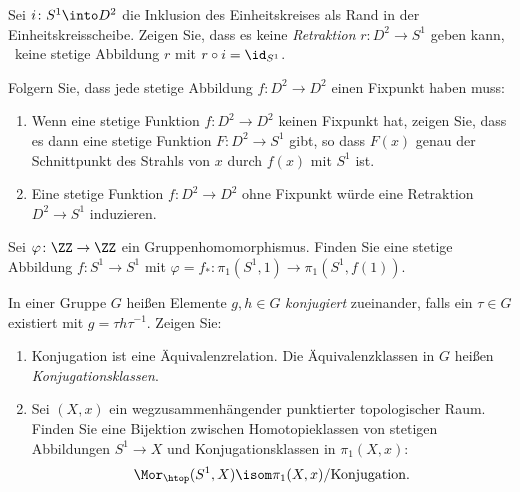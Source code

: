 

\setcounter{Sheet}{7}



\maketitle
\begin{exercise}
Sei $i\colon S^1\into D^2$ die Inklusion des Einheitskreises als Rand in
der Einheitskreisscheibe. Zeigen Sie, dass es keine \emph{Retraktion} $r\colon
D^2\to S^1$ geben kann, \ddh~keine stetige Abbildung $r$ mit $r\circ i =
\id_{S^1}$.

Folgern Sie, dass jede stetige Abbildung $f\colon D^2\to D^2$ einen Fixpunkt
haben muss:
\begin{enumerate}
\item Wenn eine stetige Funktion $f\colon D^2\to D^2$ keinen Fixpunkt hat, zeigen
Sie, dass es dann eine stetige Funktion $F\colon D^2\to S^1$ gibt, so dass
$F(x)$ genau der Schnittpunkt des Strahls von $x$ durch $f(x)$ mit $S^1$ ist.
\item Eine stetige Funktion $f\colon D^2\to D^2$ ohne Fixpunkt würde eine
Retraktion $D^2\to S^1$ induzieren.
\end{enumerate}
\end{exercise}
\begin{exercise}
Sei $\varphi\colon \ZZ\to\ZZ$ ein Gruppenhomomorphismus. Finden Sie eine stetige
Abbildung $f\colon S^1\to S^1$ mit $\varphi = f_*\colon
\pi_1(S^1,1)\to\pi_1(S^1,f(1))$.
\end{exercise}
\begin{exercise}
In einer Gruppe $G$ heißen Elemente $g,h\in G$ \emph{konjugiert} zueinander,
falls ein $\tau\in G$ existiert mit $g = \tau h \tau^{-1}$. Zeigen Sie:
\begin{enumerate}
\item Konjugation ist eine Äquivalenzrelation. Die Äquivalenzklassen in $G$
heißen \emph{Konjugationsklassen}.
\item Sei $(X,x)$ ein wegzusammenhängender punktierter topologischer
Raum. Finden Sie eine Bijektion zwischen Homotopieklassen von stetigen
Abbildungen $S^1\to X$ und Kon\-ju\-ga\-tions\-klas\-sen in $\pi_1(X, x)$:
\[
\Mor_{\htop}(S^1, X) \isom \pi_1(X,x)/{\textnormal{Konjugation}}.
\]
\end{enumerate}
\end{exercise}
\pagebreak
